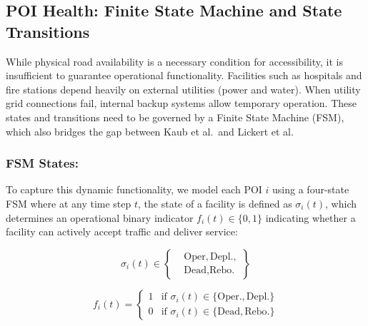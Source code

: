 \subsection{POI Health: Finite State Machine and State Transitions}
\label{subsec:poi-health-finite-state-machine}

While physical road availability is a necessary condition for accessibility, it is insufficient to guarantee operational functionality.
Facilities such as hospitals and fire stations depend heavily on external utilities (power and water).
When utility grid connections fail, internal backup systems allow temporary operation.
These states and transitions need to be governed by a Finite State Machine (FSM), which also bridges the gap between Kaub et al.\ and Lickert et al.

\subsubsection{FSM States:}
To capture this dynamic functionality, we model each POI $i$ using a four-state FSM where at any time step $t$, the state of a facility is defined as $\sigma_i(t)$, which determines an operational binary indicator $f_i(t) \in \{0, 1\}$ indicating whether a facility can actively accept traffic and deliver service:

\noindent
\begin{minipage}{0.40\textwidth}
    \begin{equation}
        \sigma_i(t) \in \left\{ \begin{aligned}
                                    &\text{Oper}, \text{Depl.}, \\
                                    &\text{Dead}, \text{Rebo.}
        \end{aligned} \right\}\label{eq:states}
    \end{equation}
\end{minipage}%
\begin{minipage}{0.60\textwidth}
    \begin{equation}
        f_i(t) = \begin{cases}
                     1 & \text{if } \sigma_i(t) \in \{\text{Oper.}, \text{Depl.}\} \\
                     0 & \text{if } \sigma_i(t) \in \{\text{Dead}, \text{Rebo.}\}
        \end{cases}\label{eq:binary_indicator}
    \end{equation}
\end{minipage}

